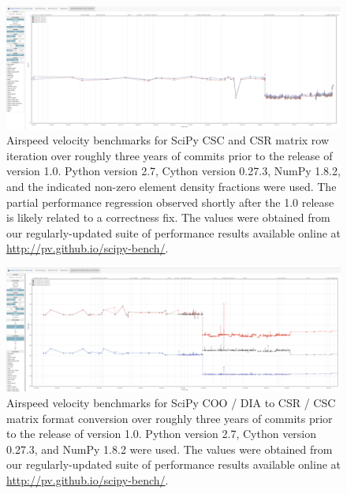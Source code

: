 \documentclass[fleqn,10pt]{wlscirep}
\begin{document}
\begin{figure}[H]
\centering
\includegraphics[width=\textwidth]{supporting_info/asv_bench/sparse/sparse_iteration_bench}
\caption{Airspeed velocity benchmarks for SciPy CSC and CSR matrix row iteration over roughly three years of commits prior to the release of version 1.0. Python version 2.7, Cython version 0.27.3, NumPy 1.8.2, and the indicated non-zero element density fractions were used. The partial performance regression observed shortly after the 1.0 release is likely related to a correctness fix\cite{sparse-regress}. The values were obtained from our regularly-updated suite of performance results available online at \url{http://pv.github.io/scipy-bench/}.}
\label{fig:sparse-iter}
\end{figure}

\begin{figure}[H]
\centering
\includegraphics[width=\textwidth]{supporting_info/asv_bench/sparse/sparse_coo_dia_to_csr_csc}
\caption{Airspeed velocity benchmarks for SciPy COO / DIA to CSR / CSC matrix format conversion over roughly three years of commits prior to the release of version 1.0. Python version 2.7, Cython version 0.27.3, and NumPy 1.8.2 were used. The values were obtained from our regularly-updated suite of performance results available online at \url{http://pv.github.io/scipy-bench/}.}
\label{fig:sparse-conv}
\end{figure}


\end{document}
